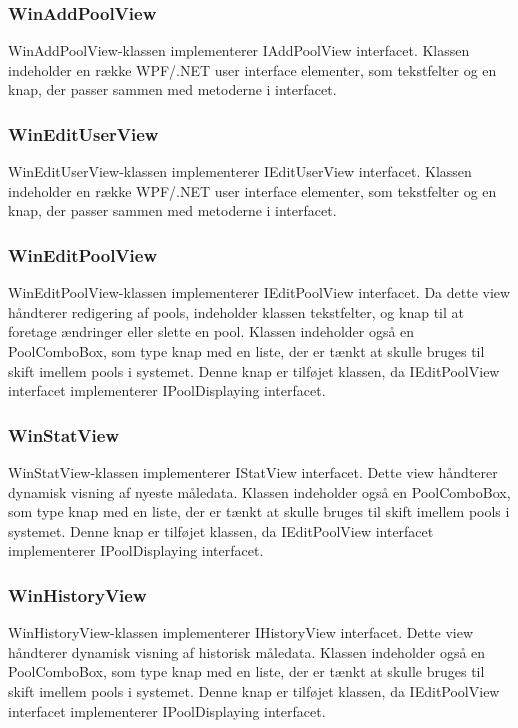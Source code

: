 \subsubsection{WinAddPoolView}
WinAddPoolView-klassen implementerer IAddPoolView interfacet. Klassen indeholder en række WPF/.NET user interface elementer, som tekstfelter og en knap, der passer sammen med metoderne i interfacet. 

\subsubsection{WinEditUserView}
WinEditUserView-klassen implementerer IEditUserView interfacet. Klassen indeholder en række WPF/.NET user interface elementer, som tekstfelter og en knap, der passer sammen med metoderne i interfacet.

\subsubsection{WinEditPoolView}
WinEditPoolView-klassen implementerer IEditPoolView interfacet. Da dette view håndterer redigering af pools, indeholder klassen tekstfelter, og knap til at foretage ændringer eller slette en pool. 
Klassen indeholder også en PoolComboBox, som type knap med en liste, der er tænkt at skulle bruges til skift imellem pools i systemet. Denne knap er tilføjet klassen, da IEditPoolView interfacet implementerer IPoolDisplaying interfacet.

\subsubsection{WinStatView}
WinStatView-klassen implementerer IStatView interfacet. Dette view håndterer dynamisk visning af nyeste måledata.
Klassen indeholder også en PoolComboBox, som type knap med en liste, der er tænkt at skulle bruges til skift imellem pools i systemet. Denne knap er tilføjet klassen, da IEditPoolView interfacet implementerer IPoolDisplaying interfacet.

\subsubsection{WinHistoryView}
WinHistoryView-klassen implementerer IHistoryView interfacet. Dette view håndterer dynamisk visning af historisk måledata.
Klassen indeholder også en PoolComboBox, som type knap med en liste, der er tænkt at skulle bruges til skift imellem pools i systemet. Denne knap er tilføjet klassen, da IEditPoolView interfacet implementerer IPoolDisplaying interfacet. 
